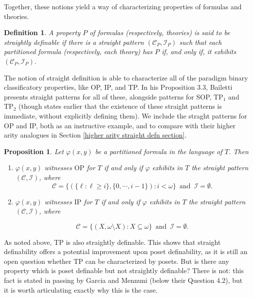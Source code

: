 \documentclass[10pt,a4paper]{amsart}
\newcommand{\calC}{\mathcal{C}}
\newcommand{\calI}{\mathcal{I}}
\newcommand{\TPi}{\text{TP}_1}
\newcommand{\TPii}{\text{TP}_2}
\newcommand{\vphi}{\varphi}
\newtheorem{proposition}{Proposition}
\newtheorem{definition}{Definition}
\begin{document}
Together, these notions yield a way of characterizing properties of formulas and theories.

\begin{definition}\label{straightly definable property}
    A property $P$ of formulas (respectively, theories) is said to be \textit{straightly definable} if there is a straight pattern $(\calC_P,\calI_P)$ such that each partitioned formula (respectively, each theory) has $P$ if, and only if, it exhibits $(\calC_P,\calI_P)$.
\end{definition}

The notion of straight definition is able to characterize all of the paradigm binary classificatory properties, like OP, IP, and TP. In his Proposition 3.3, Bailetti presents straight patterns for all of these, alongside patterns for SOP, $\TPi$ and $\TPii$ (though \cite{shelah_what_2000} states earlier that the existence of these straight patterns is immediate, without explicitly defining them). We include the straght patterns for OP and IP, both as an instructive example, and to compare with their higher arity analogues in Section \ref{higher arity straight defn section}.

\begin{proposition}\label{straight pattern examples proposition}
    Let $\vphi(x,y)$ be a partitioned formula in the language of $T$. Then
    \begin{enumerate}
        \item $\vphi(x,y)$ witnesses $\mathrm{OP}$ for $T$ if and only if $\vphi$ exhibits in $T$ the straight pattern $(\calC,\calI)$, where  
        \[\calC=\{(\{\ell\colon \ell\geq i\},\{0,\dotsm, i-1\})\colon i<\omega\}\enspace\text{and}\enspace \calI=\emptyset.\]

        \item $\vphi(x,y)$ witnesses $\mathrm{IP}$ for $T$ if and only if $\vphi$ exhibits in $T$ the straight pattern $(\calC,\calI)$, where  
        
        \[\calC=\{(X,\omega\setminus X)\colon X\subseteq \omega\}\enspace\text{and}\enspace\calI=\emptyset.\]
        
    \end{enumerate}
\end{proposition}


As noted above, TP is also straightly definable. This shows that  straight definability offers a potential improvement upon poset definability, as it is still an open question whether TP can be characterized by posets. But is there any property which is poset definable but not straightly definable? There is not: this fact is stated in passing by Garcia and Mennuni (below their Question 4.2), but it is worth articulating exactly why this is the case.
\end{document}
